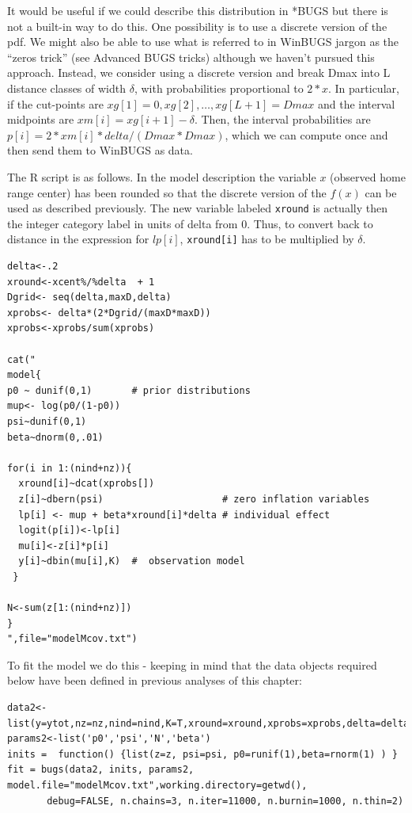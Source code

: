 It would be useful if we could describe this distribution in *BUGS but there is not a built-in way to do this.  One possibility is to use a discrete version of the pdf. We might also be able to use what is referred to in WinBUGS jargon as the ``zeros trick'' (see Advanced BUGS tricks) although we haven't pursued this approach. Instead, we consider using a discrete version and break Dmax into L distance classes of width $\delta$, with probabilities proportional to $2*x$. In particular, if the cut-points are $xg[1]=0,xg[2], \ldots, xg[L+1]=Dmax$ and the interval midpoints are $xm[i] = xg[i+1]-\delta$. Then, the interval probabilities are $p[i] = 2*xm[i]*delta/(Dmax*Dmax)$, which we can compute once and then send them to WinBUGS as data.

The R script is as follows. In the model description the variable $x$ (observed home range center) has been rounded so that the discrete version of the $f(x)$ can be used as described previously. The new variable labeled \mbox{\tt xround} is actually then the integer category label in units of delta from 0. Thus, to convert back to distance in the expression for $lp[i]$, \mbox{\tt xround[i]} has to be multiplied by $\delta$.

\begin{verbatim}
delta<-.2
xround<-xcent%/%delta  + 1
Dgrid<- seq(delta,maxD,delta)
xprobs<- delta*(2*Dgrid/(maxD*maxD))
xprobs<-xprobs/sum(xprobs)

cat("
model{
p0 ~ dunif(0,1)       # prior distributions
mup<- log(p0/(1-p0))
psi~dunif(0,1)
beta~dnorm(0,.01)

for(i in 1:(nind+nz)){
  xround[i]~dcat(xprobs[])
  z[i]~dbern(psi)                     # zero inflation variables
  lp[i] <- mup + beta*xround[i]*delta # individual effect
  logit(p[i])<-lp[i]
  mu[i]<-z[i]*p[i]
  y[i]~dbin(mu[i],K)  #  observation model
 }

N<-sum(z[1:(nind+nz)])
}
",file="modelMcov.txt")
\end{verbatim}

To fit the model we do this - keeping in mind that the data objects required below have been defined in previous analyses of this chapter:

\begin{verbatim}
data2<-list(y=ytot,nz=nz,nind=nind,K=T,xround=xround,xprobs=xprobs,delta=delta)
params2<-list('p0','psi','N','beta')
inits =  function() {list(z=z, psi=psi, p0=runif(1),beta=rnorm(1) ) }
fit = bugs(data2, inits, params2, model.file="modelMcov.txt",working.directory=getwd(),
       debug=FALSE, n.chains=3, n.iter=11000, n.burnin=1000, n.thin=2)
\end{verbatim}


